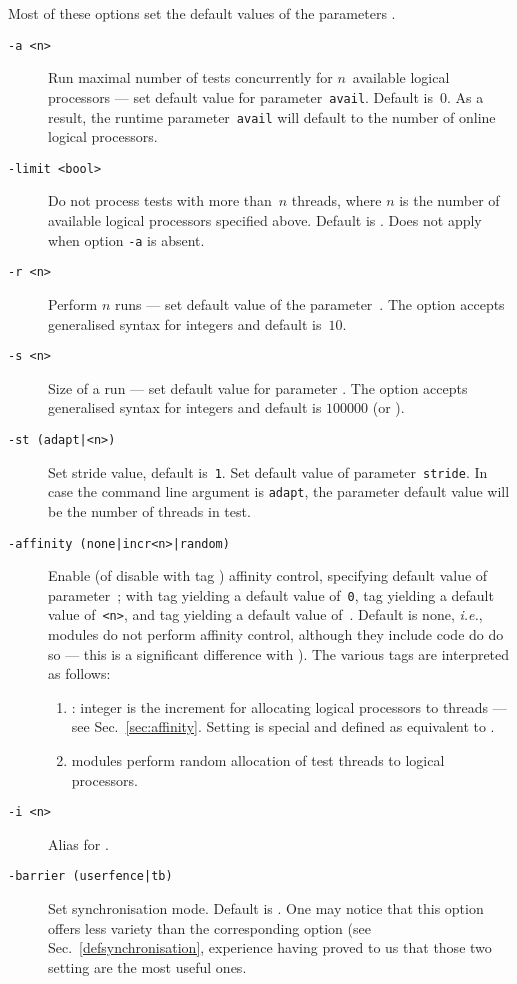Most of these options set the default values of the parameters
.
\begin{description}
\item[{\tt -a <n>}]Run maximal number of tests concurrently for $n$~available
logical processors ---
set default value for parameter~\texttt{avail}.
Default is~$0$. As a result,
the runtime parameter~\texttt{avail}
will default to the number of online logical processors.
\item[{\tt -limit <bool>}] Do not process tests with more than~$n$
threads, where $n$ is the number of available logical processors
specified above. Default is .
Does not apply  when option \texttt{-a} is absent.
\item[{\tt -r <n>}] Perform $n$ runs --- set default value
of the parameter~.
The option accepts generalised syntax for integers and
default is~$10$.
\item[{\tt -s <n>}]Size of a run --- set default value for
parameter .
The option accepts generalised syntax for integers and
default is $100000$ (or ).
\item[{\tt -st (adapt|<n>)}]
Set stride value, default is~\texttt{1}.
Set default value of parameter~\texttt{stride}.
In case the command line argument is \texttt{adapt}, the parameter default
value will be the number of threads in test.

\item[{\tt -affinity (none|incr<n>|random)}]
Enable (of disable with tag ) affinity control,
specifying default value of parameter~;
with tag  yielding a default value of~\texttt{0},
tag  yielding a default value of~\texttt{<n>},
and tag  yielding a default value of~.
Default is none, \emph{i.e.}, modules do not perform affinity control,
although they include code do do so ---
this is a significant difference with
).
The various tags are interpreted as follows:
\begin{enumerate}
\item {}:
integer  is the increment  for allocating logical
processors to threads --- see Sec.~\ref{sec:affinity}.
Setting  is special and defined as
equivalent to .
\item {} modules perform random allocation of
test threads to logical processors.
\end{enumerate}
\item[{\tt -i <n>}] Alias for .

\item[{\tt -barrier (userfence|tb)}]
Set synchronisation mode. Default is .
One may notice that this option offers less variety than
the corresponding \litmus{} option (see Sec.~\ref{defsynchronisation},
experience having proved to us
that those two setting are the most useful ones.
\end{description}

